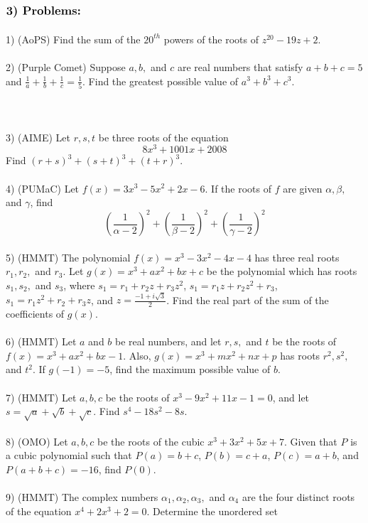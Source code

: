 \documentclass{article}
\begin{document}
$\large \textbf{3)  Problems:}$  \\
\\
1) (AoPS) Find the sum of the $20^{th}$ powers of the roots of $z^{20}-19z+2$.
\\
\\
2) (Purple Comet) Suppose $a,b,$ and $c$ are real numbers that satisfy $a+b+c=5$ and $\frac{1}{a}+\frac{1}{b}+\frac{1}{c}=\frac{1}{5}$. Find the greatest possible value of $a^3+b^3+c^3$. 
\\
\\
\\
\\
3) (AIME) Let $r,s,t$ be three roots of the equation
\begin{equation*}
8x^3+1001x+2008
\end{equation*}
Find $(r+s)^3+(s+t)^3+(t+r)^3$.
\\
\\
4) (PUMaC) Let $f(x)=3x^3-5x^2+2x-6$. If the roots of $f$ are given $\alpha, \beta,$ and $\gamma$, find
\begin{equation*}
\left ( \frac{1}{\alpha-2} \right )^2+\left ( \frac{1}{\beta-2} \right )^2+\left ( \frac{1}{\gamma-2} \right )^2
\end{equation*} 
\\
5) (HMMT) The polynomial $f(x)=x^3-3x^2-4x-4$ has three real roots $r_1,r_2,$ and $r_3$. Let $g(x)=x^3+ax^2+bx+c$ be the polynomial which has roots $s_1,s_2,$ and $s_3$, where $s_1=r_1+r_2z+r_3z^2$, $s_1=r_1z+r_2z^2+r_3$, $s_1=r_1z^2+r_2+r_3z$, and $z=\frac{-1+i\sqrt{3}}{2}$. Find the real part of the sum of the coefficients of $g(x)$.
\\
\\
6) (HMMT) Let $a$ and $b$ be real numbers, and let $r,s,$ and $t$ be the roots of $f(x)=x^3+ax^2+bx-1.$ Also, $g(x)=x^3+mx^2+nx+p$ has roots $r^2,s^2,$ and $t^2$. If $g(-1)=-5$, find the maximum possible value of $b$. 
\\
\\
7) (HMMT) Let $a,b,c$ be the roots of $x^3-9x^2+11x-1=0$, and let $s=\sqrt{a}+\sqrt{b}+\sqrt{c}$. Find $s^4-18s^2-8s$.
\\
\\
8) (OMO) Let $a,b,c$ be the roots of the cubic $x^3+3x^2+5x+7$. Given that $P$ is a cubic polynomial such that $P(a)=b+c$, $P(b)=c+a$, $P(c)=a+b$, and $P(a+b+c)=-16$, find $P(0)$.
\\
\\
9) (HMMT) The complex numbers $\alpha_1,\alpha_2,\alpha_3,$ and $\alpha_4$ are the four distinct roots of the equation $x^4+2x^3+2=0$. Determine the unordered set\\
\end{document}
